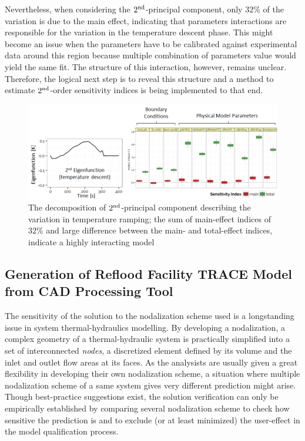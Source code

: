 \documentclass[11pt,titlepage]{article}
\begin{document}
Nevertheless, when considering the $2^\textnormal{nd}$-principal component, only $32\%$ of the variation is due to the main effect, indicating that parameters interactions are responsible for the variation in the temperature descent phase.
This might become an issue when the parameters have to be calibrated against experimental data around this region because multiple combination of parameters value would yield the same fit.
The structure of this interaction, however, remains unclear.
Therefore, the logical next step is to reveal this structure and a method to estimate $2^\textnormal{nd}$-order sensitivity indices is being implemented to that end.

\begin{figure}[h!]
	\centering
	\includegraphics[scale=0.65]{figures/2ndPrincipalComponent.png}
	\caption{The decomposition of $2^\textnormal{nd}$-principal component describing the variation in temperature ramping; the sum of main-effect indices of $32\%$ and large difference between the main- and total-effect indices, indicate a highly interacting model}
	\label{fig:2ndpc}
\end{figure}

\subsection{Generation of Reflood Facility TRACE Model from CAD Processing Tool} 

The sensitivity of the solution to the nodalization scheme used is a longstanding issue in system thermal-hydraulics modelling.
By developing a nodalization, a complex geometry of a thermal-hydraulic system is practically simplified into a set of interconnected \emph{nodes}, a discretized element defined by its volume and the inlet and outlet flow areas at its faces. 
As the analysists are usually given a great flexibility in developing their own nodalization scheme, a situation where multiple nodalization scheme of a same system gives very different prediction might arise.
Though best-practice suggestions exist, the solution verification can only be empirically established by comparing several nodalization scheme to check how sensitive the prediction is and to exclude (or at least minimized) the user-effect in the model qualification process.
\end{document}
